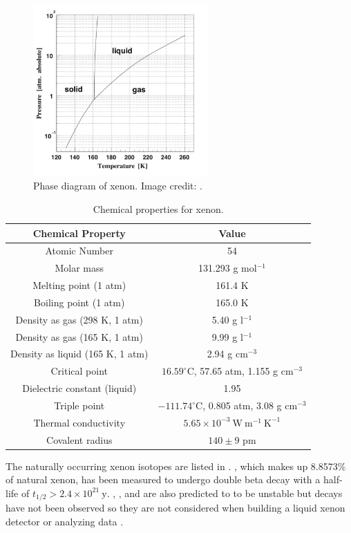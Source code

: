 \begin{figure}
\includegraphics[width=0.6\textwidth]{PhaseDiagram}
\caption{Phase diagram of xenon.  Image credit: .}
\label{fig:phase_diagram}
\end{figure}
 
\begin{table}[t]
 \centering
 \begin{tabular}{cc}
 \hline
 \hline
 Chemical Property & Value \\
 \hline
 Atomic Number & 54 \\
 Molar mass & 131.293 g mol$^{-1}$ \\
 Melting point (1 atm) & 161.4 K \\
 Boiling point (1 atm) & 165.0 K \\
 Density as gas (298 K, 1 atm)  &  5.40 g l$^{-1}$ \\
 Density as gas (165 K, 1 atm)  &  9.99 g l$^{-1}$ \\
 Density as liquid (165 K, 1 atm) & 2.94 g cm$^{-3}$ \\
 Critical point & $16.59^{\circ}$C, 57.65 atm, 1.155 g cm$^{-3}$ \\
 Dielectric constant (liquid) & 1.95 \\
 Triple point & $-111.74^{\circ}$C, 0.805 atm, 3.08 g cm$^{-3}$ \\
 Thermal conductivity & $5.65 \times 10^{-3}\ \mathrm{W\ m^{-1}\ K^{-1}}$ \\
 Covalent radius & $140 \pm 9$ pm \\
 \hline
 \hline
 \end{tabular}
 \caption{Chemical properties for xenon.}
\label{tab:xe_properties}
\end{table}

The naturally occurring xenon isotopes are listed in .  , which makes up 8.8573\% of natural xenon,
has been measured to undergo double beta decay with a half-life of $t_{1/2} > 2.4 \times 10^{21}\ \mathrm{y}$.  ,
,
and  are also predicted to to be unstable but decays have not been observed so they are not considered when building a
liquid xenon detector or analyzing data .

